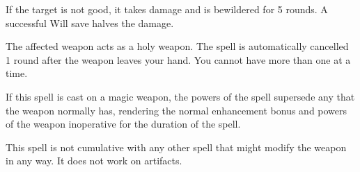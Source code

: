 \spellrng{\rngmed}
\begin{spelleffect}
  If the target is not good, it takes damage and is bewildered for 5 rounds. A successful Will save halves the damage.
\end{spelleffect}

\spellrng{\rngtouch}
\spelldur{\durmed}
\begin{spelleffect}
  The affected weapon acts as a  holy weapon. The spell is automatically cancelled 1 round after the weapon leaves your hand. You cannot have more than one  at a time.
  \par If this spell is cast on a magic weapon, the powers of the spell supersede any that the weapon normally has, rendering the normal enhancement bonus and powers of the weapon inoperative for the duration of the spell.
\end{spelleffect}
\begin{spellnotes}
  This spell is not cumulative with any other spell that might modify the weapon in any way. It does not work on artifacts.
\end{spellnotes}

